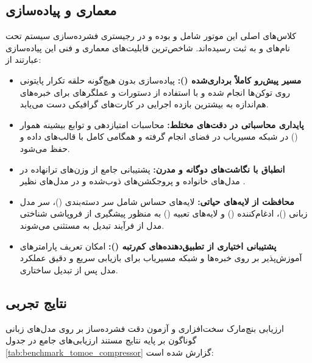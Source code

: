 \subsection{معماری و پیاده‌سازی}
کلاس‌های اصلی این موتور شامل  و  بوده و در رجیستری فشرده‌سازی سیستم تحت نام‌های  و  به ثبت رسیده‌اند. شاخص‌ترین قابلیت‌های معماری و فنی این پیاده‌سازی عبارتند از:
\begin{itemize}
    \item \textbf{مسیر پیش‌رو کاملاً برداری‌شده ():} پیاده‌سازی بدون هیچ‌گونه حلقه تکرار پایتونی روی توکن‌ها انجام شده و با استفاده از دستورات  و عملگرهای  برای خبره‌های هم‌اندازه به بیشترین بازده اجرایی در کارت‌های گرافیکی دست می‌یابد.
    \item \textbf{پایداری محاسباتی در دقت‌های مختلط:} محاسبات امتیازدهی و توابع بیشینه هموار () در شبکه مسیریاب در فضای  انجام گرفته و همگامی کامل با قالب‌های داده  و  حفظ می‌شود.
    \item \textbf{انطباق با نگاشت‌های دوگانه و مدرن:} پشتیبانی جامع از وزن‌های ترانهاده  در مدل‌های خانواده  و پروجکشن‌های ذوب‌شده و  در مدل‌های نظیر .
    \item \textbf{محافظت از لایه‌های حیاتی:} لایه‌های حساس شامل سر دسته‌بندی ()، سر مدل زبانی ()، ادغام‌کننده () و لایه‌های تعبیه () به منظور پیشگیری از فروپاشی شناختی مدل از فرآیند تبدیل به  مستثنی می‌شوند.
    \item \textbf{پشتیبانی اختیاری از تطبیق‌دهنده‌های کم‌رتبه ():} امکان تعریف پارامترهای آموزش‌پذیر  بر روی خبره‌ها و شبکه مسیریاب برای بازیابی سریع و دقیق عملکرد مدل پس از تبدیل ساختاری.
\end{itemize}

\subsection{نتایج تجربی}
ارزیابی بنچ‌مارک سخت‌افزاری و آزمون دقت فشرده‌ساز  بر روی مدل‌های زبانی گوناگون بر پایه نتایج مستند ارزیابی‌های جامع در جدول \ref{tab:benchmark_tomoe_compressor} گزارش شده است:

